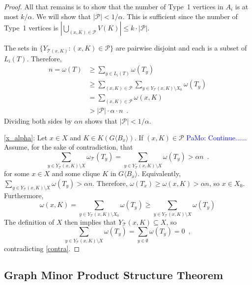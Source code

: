 \documentclass{patmorin}
\newcommand{\torso}[2]{{#1}\langle{#2}\rangle}
\renewcommand{\ge}{\geqslant}
\renewcommand{\le}{\leqslant}
\newcommand{\david}[1]{{\color{orange} DW: #1}}
\newcommand{\pat}[1]{\textcolor{Blue}{PaMo: #1}}
\let\eqref\cref
\begin{document}
\begin{proof}
    All that remains is to show that the number of Type~1 vertices in $A_i$ is at most $k/\alpha$.  We will show that $|\mathcal{P}|<1/\alpha$. This is sufficient since the number of Type~1 vertices is $|\bigcup_{(x,K)\in\mathcal{P}} V(K)|\le k\cdot|\mathcal{P}|$.

    The sets in $\{Y_{\mathcal{T}(x,K)}:(x,K)\in\mathcal{P}\}$ are pairwise disjoint and each is a subset of $L_i(T)$.   Therefore,
    \begin{align*}
        n = \omega(T)
        & \ge \sum_{y\in L_i(T)} \omega(T_y) \\
        & \ge \sum_{(x,K)\in\mathcal{P}}\sum_{y\in Y_\mathcal{T}(x,K)\setminus X_0}\omega(T_y) \\
        & = \sum_{(x,K)\in\mathcal{P}}\omega(x,K) \\
        & > |\mathcal{P}|\cdot\alpha\cdot n \enspace .
    \end{align*}
    Dividing both sides by $\alpha n$ shows that $|\mathcal{P}| < 1/\alpha$.

    \noindent\ref{x_alpha}: Let $x\in X$ and $K\in K(\torso{G}{B_x})$.  If $(x,K)\in\mathcal{P}$ \pat{Continue......} Assume, for the sake of contradiction, that
    \begin{equation}
       \sum_{y\in Y_{\mathcal{T}}(x,K)\setminus X}\omega_\mathcal{T}(T_y)
       = \sum_{y\in Y_{\mathcal{T}}(x,K)\setminus X}\omega(T_y)
       > \alpha n \enspace . \label{contra}
    \end{equation}
    for some $x\in X$ and some clique $K$ in $\torso{G}{B_x}$.  Equivalently, $\sum_{y\in Y_{\mathcal{T}}(x,K)\setminus X}\omega(T_y) > \alpha n$.  Therefore, $\omega(T_x) \ge \omega(x,K) > \alpha n$, so $x\in X_0$. Furthermore,
    \[
      \omega(x,K)
       = \sum_{y\in Y_{\mathcal{T}}(x,K)\setminus X_0}\omega(T_y)
       \ge \sum_{y\in Y_{\mathcal{T}}(x,K)\setminus X}\omega(T_y)
    \]
    The definition of $X$ then implies that $Y_{\mathcal{T}}(x,K)\subseteq X$, so
    \[
      \sum_{y\in Y_{\mathcal{T}}(x,K)\setminus X} \omega(T_y)=\sum_{y\in \emptyset}\omega(T_y)=0 \enspace ,
    \]
    contradicting \eqref{contra}.
  \end{proof}

  \subsection{Graph Minor Product Structure Theorem}

\end{document}
